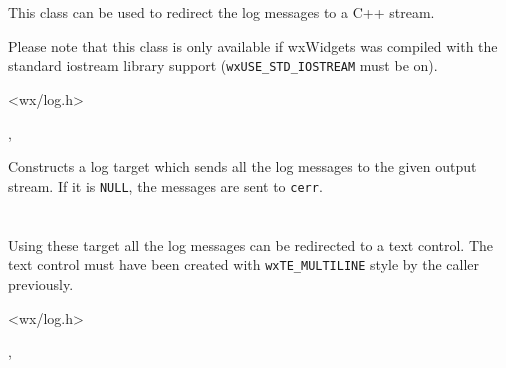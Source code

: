 
\section{}\label{wxlogstream}

This class can be used to redirect the log messages to a C++ stream.

Please note that this class is only available if wxWidgets was compiled with
the standard iostream library support ({\tt wxUSE\_STD\_IOSTREAM} must be on).




<wx/log.h>


,\\


\label{wxlogstreamctor}


Constructs a log target which sends all the log messages to the given
output stream. If it is {\tt NULL}, the messages are sent to {\tt cerr}.


\section{}\label{wxlogtextctrl}

Using these target all the log messages can be redirected to a text control.
The text control must have been created with {\tt wxTE\_MULTILINE} style by the
caller previously.




<wx/log.h>


,\\

